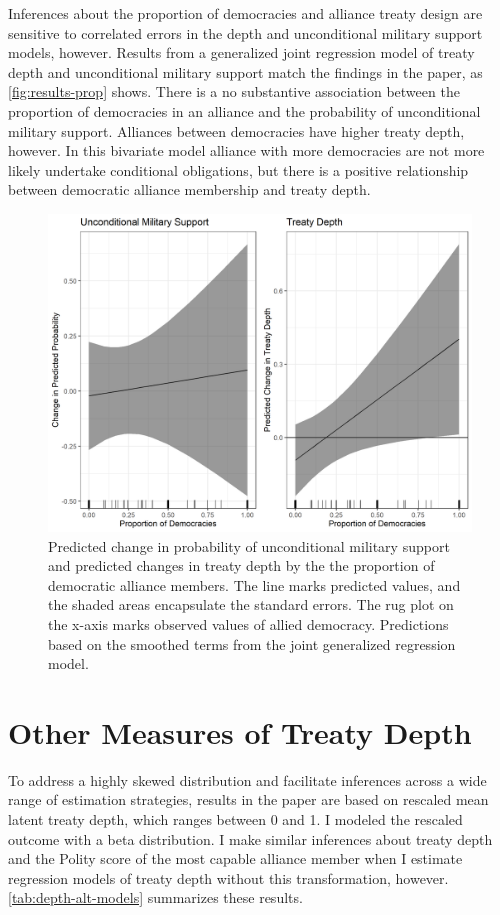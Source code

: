\documentclass[12pt]{article}
\begin{document}
Inferences about the proportion of democracies and alliance treaty design are sensitive to correlated errors in the depth and unconditional military support models, however. 
Results from a generalized joint regression model of treaty depth and unconditional military support match the findings in the paper, as \autoref{fig:results-prop} shows. 
There is a no substantive association between the proportion of democracies in an alliance and the probability of unconditional military support. 
Alliances between democracies have higher treaty depth, however. 
In this bivariate model alliance with more democracies are not more likely undertake conditional obligations, but there is a positive relationship between democratic alliance membership and treaty depth. 


\begin{figure}
\includegraphics[width=.95\textwidth]{results-prop.png}  
\caption{Predicted change in probability of unconditional military support and predicted changes in treaty depth by the the proportion of democratic alliance members. The line marks predicted values, and the shaded areas encapsulate the standard errors. The rug plot on the x-axis marks observed values of allied democracy. Predictions based on the smoothed terms from the joint generalized regression model.}
\label{fig:results-prop}
\end{figure}


\section{Other Measures of Treaty Depth}


To address a highly skewed distribution and facilitate inferences across a wide range of estimation strategies, results in the paper are based on rescaled mean latent treaty depth, which ranges between 0 and 1. 
I modeled the rescaled outcome with a beta distribution. 
I make similar inferences about treaty depth and the Polity score of the most capable alliance member when I estimate regression models of treaty depth without this transformation, however. 
\autoref{tab:depth-alt-models} summarizes these results. 
\end{document}
